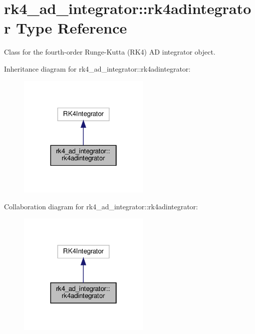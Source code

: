 \hypertarget{structrk4__ad__integrator_1_1rk4adintegrator}{}\section{rk4\+\_\+ad\+\_\+integrator\+:\+:rk4adintegrator Type Reference}
\label{structrk4__ad__integrator_1_1rk4adintegrator}


Class for the fourth-\/order Runge-\/\+Kutta (R\+K4) AD integrator object.  




Inheritance diagram for rk4\+\_\+ad\+\_\+integrator\+:\+:rk4adintegrator\+:\nopagebreak
\begin{figure}[H]
\begin{center}
\leavevmode
\includegraphics[width=178pt]{structrk4__ad__integrator_1_1rk4adintegrator__inherit__graph}
\end{center}
\end{figure}


Collaboration diagram for rk4\+\_\+ad\+\_\+integrator\+:\+:rk4adintegrator\+:\nopagebreak
\begin{figure}[H]
\begin{center}
\leavevmode
\includegraphics[width=178pt]{structrk4__ad__integrator_1_1rk4adintegrator__coll__graph}
\end{center}
\end{figure}


